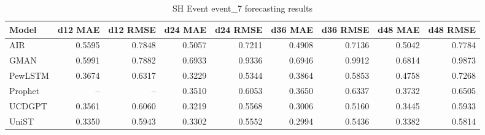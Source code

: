 \begin{table}[htbp]
\centering
\small
\caption{SH Event event\_7 forecasting results}
\label{tab:sh-event-event-7}
\begin{tabular}{lrrrrrrrr}
\toprule
Model & d12 MAE & d12 RMSE & d24 MAE & d24 RMSE & d36 MAE & d36 RMSE & d48 MAE & d48 RMSE \\
\midrule
AIR & 0.5595 & 0.7848 & 0.5057 & 0.7211 & 0.4908 & 0.7136 & 0.5042 & 0.7784 \\
GMAN & 0.5991 & 0.7882 & 0.6933 & 0.9336 & 0.6946 & 0.9912 & 0.6814 & 0.9873 \\
PewLSTM & 0.3674 & 0.6317 & 0.3229 & 0.5344 & 0.3864 & 0.5853 & 0.4758 & 0.7268 \\
Prophet & -- & -- & 0.3510 & 0.6053 & 0.3650 & 0.6337 & 0.3732 & 0.6505 \\
UCDGPT & 0.3561 & 0.6060 & 0.3219 & 0.5568 & 0.3006 & 0.5160 & 0.3445 & 0.5933 \\
UniST & 0.3350 & 0.5943 & 0.3302 & 0.5552 & 0.2994 & 0.5436 & 0.3382 & 0.5814 \\
\bottomrule
\end{tabular}
\end{table}
